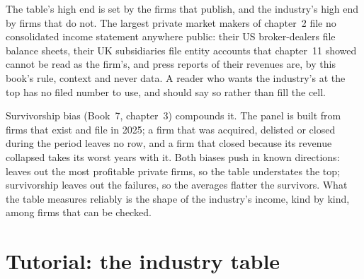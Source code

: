 The table's high end is set by the firms that publish, and the industry's high end by firms that do not. The largest
private market makers of chapter~2 file no consolidated income statement anywhere public: their US broker-dealers file
balance sheets, their UK subsidiaries file entity accounts that chapter~11 showed cannot be read as the firm's, and
press reports of their revenues are, by this book's rule, context and never data. A reader who wants the industry's
 at the top has no filed number to use, and should say so rather than fill the cell.

Survivorship bias (Book~7, chapter~3) compounds it. The panel is built from firms that exist and file in 2025; a firm
that was acquired, delisted or closed during the period leaves no row, and a firm that closed because its revenue
collapsed takes its worst years with it. Both biases push in known directions:  leaves out the most profitable private firms,
so the table understates the top; survivorship leaves out the failures, so the averages flatter the survivors. What the
table measures reliably is the shape of the industry's income, kind by kind, among firms that can be checked.

\section{Tutorial: the industry table}\label{tut:in:revenue-and-profit-across-the-industry:tut}

